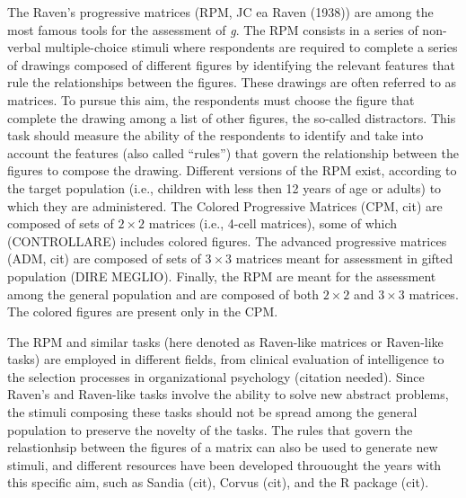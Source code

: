 The Raven's progressive matrices (RPM, JC ea Raven (1938)) are among the most famous tools for the assessment of \emph{g}. The RPM consists in a series of non-verbal multiple-choice stimuli where respondents are required to complete a series of drawings composed of different figures by identifying the relevant features that rule the relationships between the figures. These drawings are often referred to as matrices.
To pursue this aim, the respondents must choose the figure that complete the drawing among a list of other figures, the so-called distractors.
This task should measure the ability of the respondents to identify and take into account the features (also called ``rules'') that govern the relationship between the figures to compose the drawing. Different versions of the RPM exist, according to the target population (i.e., children with less then 12 years of age or adults) to which they are administered. The Colored Progressive Matrices (CPM, cit) are composed of sets of \(2\times2\) matrices (i.e., 4-cell matrices), some of which (CONTROLLARE) includes colored figures. The advanced progressive matrices (ADM, cit) are composed of sets of \(3\times3\) matrices meant for assessment in gifted population (DIRE MEGLIO). Finally, the RPM are meant for the assessment among the general population and are composed of both \(2\times2\) and \(3\times3\) matrices. The colored figures are present only in the CPM.

The RPM and similar tasks (here denoted as Raven-like matrices or Raven-like tasks) are employed in different fields, from clinical evaluation of intelligence to the selection processes in organizational psychology (citation needed).
Since Raven's and Raven-like tasks involve the ability to solve new abstract problems, the stimuli composing these tasks should not be spread among the general population to preserve the novelty of the tasks.
The rules that govern the relastionhsip between the figures of a matrix can also be used to generate new stimuli, and different resources have been developed throuought the years with this specific aim, such as Sandia (cit), Corvus (cit), and the R package  (cit).

